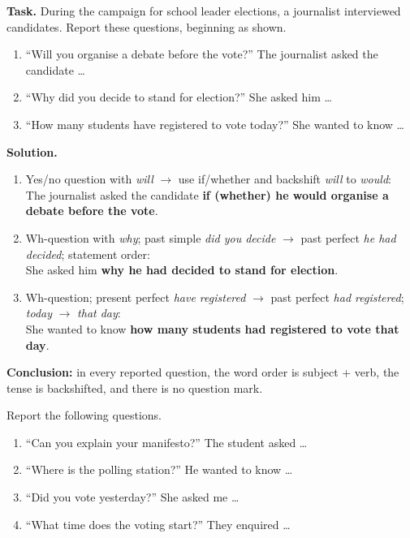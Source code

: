 \documentclass[11pt]{article}
\newcommand{\cle}[1]{{\popxbold\color{popdark}#1}}
\begin{document}
\begin{exoresolu}
\textbf{Task.} During the campaign for school leader elections, a journalist interviewed candidates. Report these questions, beginning as shown.
\begin{enumerate}
\item ``Will you organise a debate before the vote?'' The journalist asked the candidate \ldots
\item ``Why did you decide to stand for election?'' She asked him \ldots
\item ``How many students have registered to vote today?'' She wanted to know \ldots
\end{enumerate}
\tcblower
\textbf{Solution.}
\begin{enumerate}
\item Yes/no question with \emph{will} $\rightarrow$ use \cle{if/whether} and backshift \emph{will} to \emph{would}: \\
The journalist asked the candidate \textbf{if (whether) he would organise a debate before the vote}.
\item Wh-question with \emph{why}; past simple \emph{did you decide} $\rightarrow$ past perfect \emph{he had decided}; statement order: \\
She asked him \textbf{why he had decided to stand for election}.
\item Wh-question; present perfect \emph{have registered} $\rightarrow$ past perfect \emph{had registered}; \emph{today} $\rightarrow$ \emph{that day}: \\
She wanted to know \textbf{how many students had registered to vote that day}.
\end{enumerate}
\textbf{Conclusion:} in every reported question, the word order is subject + verb, the tense is backshifted, and there is no question mark.
\end{exoresolu}

\begin{exercice}
Report the following questions.
\begin{enumerate}
\item ``Can you explain your manifesto?'' The student asked \ldots
\item ``Where is the polling station?'' He wanted to know \ldots
\item ``Did you vote yesterday?'' She asked me \ldots
\item ``What time does the voting start?'' They enquired \ldots
\end{enumerate}
\end{exercice}
\end{document}
